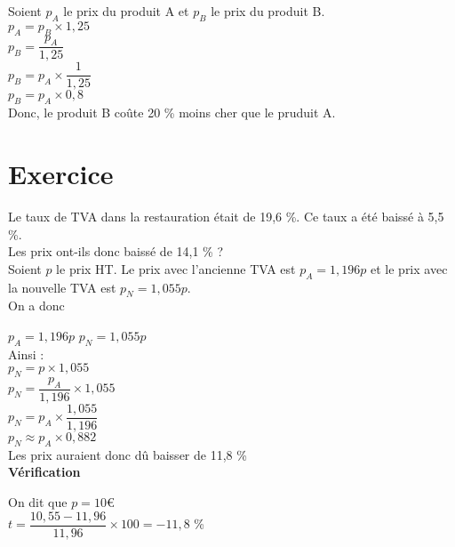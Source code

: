 Soient $p_A$ le prix du produit A et $p_B$ le prix du produit B. \\

$p_A = p_B \times 1,25 $ \\

$ p_B = \dfrac{p_A}{1,25} $ \\

$ p_B = p_A \times \dfrac{1}{1,25} $ \\

$ p_B = p_A \times 0,8 $ \\

Donc, le produit B coûte 20 \% moins cher que le pruduit A.

\section{Exercice }

Le taux de TVA dans la restauration était de 19,6 \%. Ce taux a été baissé à 5,5 \%. \\

Les prix ont-ils donc baissé de 14,1 \% ? \\

Soient $p$ le prix HT. Le prix avec l'ancienne TVA est $p_A = 1,196p$ et le prix avec la nouvelle TVA est $p_N = 1,055p$. \\


On a donc 

$p_A = 1,196p$
$ p_N = 1,055 p$ \\

Ainsi : \\

$p_N = p \times 1,055$ \\

$ p_N = \dfrac{p_A}{1,196} \times 1,055 $ \\

$ p_N = p_A \times \dfrac{1,055}{1,196} $ \\

$ p_N \approx p_A  \times 0,882 $ \\

Les prix auraient donc dû baisser de 11,8 \% \\

\textbf{Vérification} 

On dit que $p = 10$€ \\

$ t = \dfrac{10,55 - 11,96}{11,96} \times 100 = - 11,8$ \%

